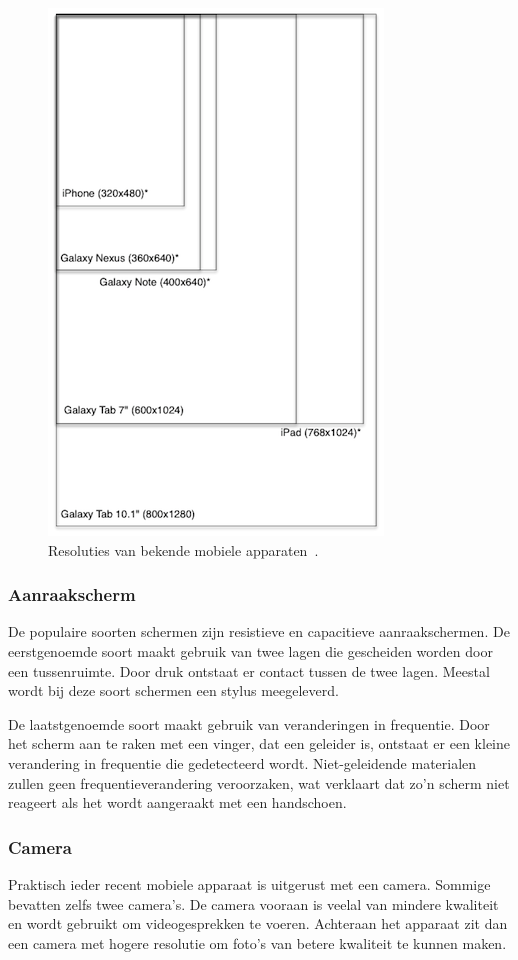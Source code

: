 \begin{figure}
  \centering
  \includegraphics[height=0.8\textwidth]{figuren/mobile-devices-resolutions.png}
  \caption{Resoluties van bekende mobiele apparaten~\cite{Wolfermann2012}.}
  \label{fig:resoluties}
\end{figure}

\subsubsection{Aanraakscherm}
De populaire soorten schermen zijn resistieve en capacitieve aanraakschermen. 
De eerstgenoemde soort maakt gebruik van twee lagen die gescheiden worden door een tussenruimte. 
Door druk ontstaat er contact tussen de twee lagen. 
Meestal wordt bij deze soort schermen een stylus meegeleverd. 

De laatstgenoemde soort maakt gebruik van veranderingen in frequentie. 
Door het scherm aan te raken met een vinger, dat een geleider is, ontstaat er een kleine verandering in frequentie die gedetecteerd wordt. 
Niet-geleidende materialen zullen geen frequentieverandering veroorzaken, wat verklaart dat zo'n scherm niet reageert als het wordt aangeraakt met een handschoen.

\subsubsection{Camera}
Praktisch ieder recent mobiele apparaat is uitgerust met een camera. 
Sommige bevatten zelfs twee camera's. 
De camera vooraan is veelal van mindere kwaliteit en wordt gebruikt om videogesprekken te voeren. 
Achteraan het apparaat zit dan een camera met hogere resolutie om foto's van betere kwaliteit te kunnen maken.


